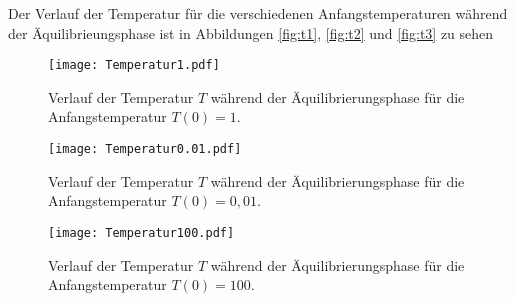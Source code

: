 Der Verlauf der Temperatur für die verschiedenen Anfangstemperaturen während der Äquilibrieungsphase ist in Abbildungen \ref{fig:t1}, \ref{fig:t2} und \ref{fig:t3} zu sehen
\FloatBarrier
\begin{figure}[H]
    \centering
    \texttt{[image: Temperatur1.pdf]}
    \caption{Verlauf der Temperatur $T$ während der Äquilibrierungsphase für die Anfangstemperatur $T(0) = 1$.}
    \label{fig:p1}
\end{figure}
\FloatBarrier
\noindent
\FloatBarrier
\begin{figure}[H]
    \centering
    \texttt{[image: Temperatur0.01.pdf]}
    \caption{Verlauf der Temperatur $T$ während der Äquilibrierungsphase für die Anfangstemperatur $T(0) = 0,01$.}
    \label{fig:p2}
\end{figure}
\FloatBarrier
\noindent
\FloatBarrier
\begin{figure}[H]
    \centering
    \texttt{[image: Temperatur100.pdf]}
    \caption{Verlauf der Temperatur $T$ während der Äquilibrierungsphase für die Anfangstemperatur $T(0) = 100$.}
    \label{fig:p3}
\end{figure}
\FloatBarrier
\noindent

